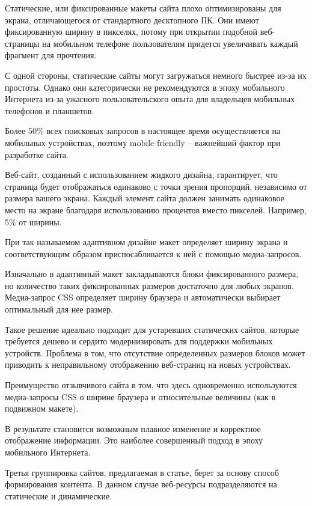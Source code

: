 Статические, или фиксированные макеты сайта плохо оптимизированы для экрана, отличающегося от стандартного десктопного ПК.
Они имеют фиксированную ширину в пикселях, потому при открытии подобной веб-страницы на мобильном телефоне пользователям придется увеличивать каждый фрагмент для прочтения.

С одной стороны, статические сайты могут загружаться немного быстрее из-за их простоты. Однако они категорически не рекомендуются в эпоху мобильного Интернета из-за ужасного пользовательского опыта для владельцев мобильных телефонов и планшетов.

Более 50\% всех поисковых запросов в настоящее время осуществляется на мобильных устройствах, поэтому mobile friendly – важнейший фактор при разработке сайта.

Веб-сайт, созданный с использованием жидкого дизайна, гарантирует, что страница будет отображаться одинаково с точки зрения пропорций, независимо от размера вашего экрана.
Каждый элемент сайта должен занимать одинаковое место на экране благодаря использованию процентов вместо пикселей.
Например, 5\% от ширины.

При так называемом адаптивном дизайне макет определяет ширину экрана и соответствующим образом приспосабливается к ней с помощью медиа-запросов.

Изначально в адаптивный макет закладываются блоки фиксированного размера, но количество таких фиксированных размеров достаточно для любых экранов.
Медиа-запрос CSS определяет ширину браузера и автоматически выбирает оптимальный для нее размер.

Такое решение идеально подходит для устаревших статических сайтов, которые требуется дешево и сердито модернизировать для поддержки мобильных устройств.
Проблема в том, что отсутствие определенных размеров блоков может приводить к неправильному отображению веб-страниц на новых устройствах.

Преимущество отзывчивого сайта в том, что здесь одновременно используются медиа-запросы CSS о ширине браузера и относительные величины (как в подвижном макете).

В результате становится возможным плавное изменение и корректное отображение информации.
Это наиболее совершенный подход в эпоху мобильного Интернета.


Третья группировка сайтов, предлагаемая в статье, берет за основу способ формирования контента.
В данном случае веб-ресурсы подразделяются на статические и динамические.

